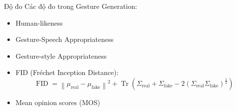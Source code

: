 

\begin{frame}{Độ đo}
	Các độ đo trong Gesture Generation:
	\begin{itemize}
		\item Human-likeness
		\item Gesture-Speech Appropriateness
		\item Gesture-style Appropriateness
	\item {FID (Fréchet Inception Distance)}:
	\begin{equation*}
		\operatorname{FID} = \left\| \mu_{\operatorname{real}} - \mu_{\operatorname{fake}} \right\|^2 + \operatorname{Tr} \left( \Sigma_{\operatorname{real}} + \Sigma_{\operatorname{fake}} - 2 \left( \Sigma_{\operatorname{real}} \Sigma_{\operatorname{fake}} \right)^{\frac{1}{2}} \right)
	\end{equation*}
	 \item Mean opinion scores (MOS)
	
\end{itemize}
\end{frame}
